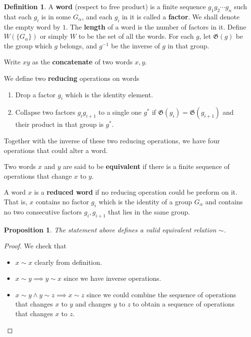 \documentclass[a4paper,titlepage]{article}
\theoremstyle{remark}
\theoremstyle{definition}
\theoremstyle{definition}
\newtheorem{definition}{Definition}
\theoremstyle{plain}
\newtheorem{proposition}{Proposition}
\newcommand{\gid}{\mathfrak{G}}
\begin{document}
  \begin{definition}
    A {\bf word} (respect to free product) is a finite sequence $g_1 g_2 \cdots g_n$ such that
    each $g_i$ is in some $G_\alpha$, and each $g_i$ in it is called a {\bf factor}.
    We shall denote the empty word by $1$. The {\bf length}
    of a word is the number of factors in it. Define $W(\{G_\alpha\})$ or simply $W$ 
    to be the set of all the words. For each $g$, let $\gid(g)$ be the group which $g$ belongs, 
    and $g^{-1}$ be the inverse of $g$ in that group.

    Write $xy$ as the {\bf concatenate} of two words $x, y$.

    We define two {\bf reducing} operations on words
    \begin{enumerate}
      \item Drop a factor $g_i$ which is the identity element.
      \item Collapse two factors $g_i g_{i+1}$ to a single one $g^*$ if $\gid(g_i) = \gid(g_{i+1})$
        and their product in that group is $g^*$.
    \end{enumerate}
    Together with the inverse of these two reducing operations, we have four operations
    that could alter a word.

    Two words $x$ and $y$ are said to be {\bf equivalent} if there is a finite sequence of 
    operations that change $x$ to $y$.

    A word $x$ is a {\bf reduced word} if no reducing operation could be preform on it. That is,
    $x$ contains no factor $g_i$ which is the identity of a group $G_\alpha$ and contains no
    two consecutive factors $g_i, g_{i+1}$ that lies in the same group.
  \end{definition}
  \begin{proposition}
    The statement above defines a valid equivalent relation $\sim$.
  \end{proposition}
  \begin{proof}
    We check that
    \begin{itemize}
      \item $x \sim x$ clearly from definition.
      \item $x \sim y \implies y \sim x$ since we have inverse operations.
      \item $x \sim y \land y \sim z \implies x \sim z$ since we could combine the sequence 
        of operations that changes $x$ to $y$ and changes $y$ to $z$ to obtain a sequence 
        of operations that changes $x$ to $z$.
    \end{itemize}
  \end{proof}
\end{document}
